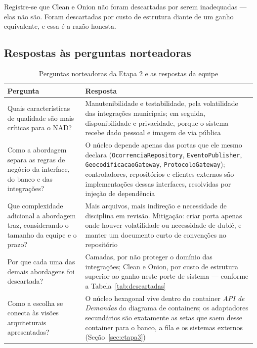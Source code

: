 \documentclass[12pt,a4paper,oneside]{article}
\newcommand{\fonte}[1]{\par\vspace{5pt}{\footnotesize\singlespacing Fonte: #1\par}}
\newcommand{\cab}[1]{\textbf{\footnotesize #1}}
\begin{document}
Registre-se que Clean e Onion não foram descartadas por serem inadequadas — elas
não são. Foram descartadas por custo de estrutura diante de um ganho
equivalente, e essa é a razão honesta.

\subsection{Respostas às perguntas norteadoras}

\begin{table}[H]
\centering
\caption{Perguntas norteadoras da Etapa 2 e as respostas da equipe}
\label{tab:norteadoras}
{\small\singlespacing
\begin{tabularx}{\textwidth}{L{5.0cm} X}
\toprule
\cab{Pergunta} & \cab{Resposta} \\
\midrule
Quais características de qualidade são mais críticas para o NAD? &
Manutenibilidade e testabilidade, pela volatilidade das integrações municipais;
em seguida, disponibilidade e privacidade, porque o sistema recebe dado pessoal
e imagem de via pública \\
\addlinespace
Como a abordagem separa as regras de negócio da interface, do banco e das
integrações? & O núcleo depende apenas das portas que ele mesmo declara
(\texttt{OcorrenciaRepository}, \texttt{EventoPublisher},
\texttt{GeocodificacaoGateway}, \texttt{ProtocoloGateway}); controladores,
repositórios e clientes externos são implementações dessas interfaces,
resolvidas por injeção de dependência \\
\addlinespace
Que complexidade adicional a abordagem traz, considerando o tamanho da equipe e
o prazo? & Mais arquivos, mais indireção e necessidade de disciplina em revisão.
Mitigação: criar porta apenas onde houver volatilidade ou necessidade de dublê,
e manter um documento curto de convenções no repositório \\
\addlinespace
Por que cada uma das demais abordagens foi descartada? & Camadas, por não
proteger o domínio das integrações; Clean e Onion, por custo de estrutura
superior ao ganho neste porte de sistema — conforme a
Tabela~\ref{tab:descartadas} \\
\addlinespace
Como a escolha se conecta às visões arquiteturais apresentadas? & O núcleo
hexagonal vive dentro do container \emph{API de Demandas} do diagrama de
containers; os adaptadores secundários são exatamente as setas que saem desse
container para o banco, a fila e os sistemas externos
(Seção~\ref{sec:etapa3}) \\
\bottomrule
\end{tabularx}}
\fonte{elaborado pelos autores (2026).}
\end{table}
\end{document}
